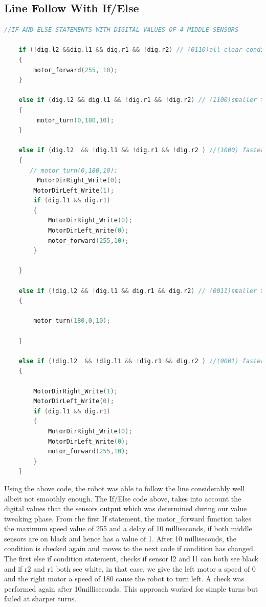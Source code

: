 \documentclass[11pt,a4paper,oneside,article]{memoir}
\begin{document}
\subsection{Line Follow With If/Else}
\vspace{-22pt}\begin{lstlisting}[language=C,caption={If Else Line Follow},label=Follow] 
 //IF AND ELSE STATEMENTS WITH DIGITAL VALUES OF 4 MIDDLE SENSORS
       
    if (!dig.l2 &&dig.l1 && dig.r1 && !dig.r2) // (0110)all clear condition
    {
        motor_forward(255, 10);
    }
    
    else if (dig.l2 && dig.l1 && !dig.r1 && !dig.r2) // (1100)smaller turn here to the left
    {
         motor_turn(0,180,10);
    }
    
    else if (dig.l2  && !dig.l1 && !dig.r1 && !dig.r2 ) //(1000) faster turn to the left
    {
       // motor_turn(0,180,10);
         MotorDirRight_Write(0);
        MotorDirLeft_Write(1);
        if (dig.l1 && dig.r1)
        {
            MotorDirRight_Write(0);
            MotorDirLeft_Write(0);
            motor_forward(255,10);
        }
        
    }
    
    else if (!dig.l2 && !dig.l1 && dig.r1 && dig.r2) // (0011)smaller turn here to the right
    {
        
        motor_turn(180,0,10);
        
    }
    
    else if (!dig.l2  && !dig.l1 && !dig.r1 && dig.r2 ) //(0001) faster turn to the right
    {
       
        MotorDirRight_Write(1);
        MotorDirLeft_Write(0);
        if (dig.l1 && dig.r1)
        {
            MotorDirRight_Write(0);
            MotorDirLeft_Write(0);
            motor_forward(255,10);
        }
    } 
\end{lstlisting}\vspace{-22pt}
Using the above code, the robot was able to follow the line considerably well albeit not smoothly enough. The If/Else code above, takes into account the digital values that the sensors output which was determined during our value tweaking phase. From the first If statement, the motor\_forward function takes the maximum speed value of 255 and a delay of 10 milliseconds, if both middle sensors are on black and hence has a value of 1. After 10 milliseconds, the condition is checked again and moves to the next code if condition has changed. 
The first else if condition statement, checks if sensor l2 and l1  can both see black and if r2 and r1 both see white, in that case, we give the left motor a speed of 0 and the right motor a speed of 180 cause the robot to turn left. A  check was performed again after 10milliseconds. This approach worked for simple turns but failed at sharper turns. 
\end{document}
